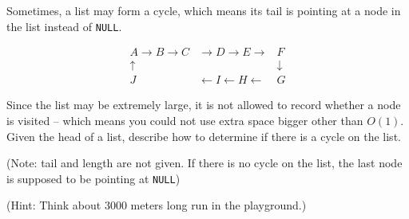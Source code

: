 \documentclass[10.5pt]{article}
\begin{document}
\begin{enumerate}[(a)]
		Sometimes, a list may form a cycle, which means its tail is pointing at 
		a node in the list  instead of \texttt{NULL}.
		
		$$
		\begin{aligned}
		A \rightarrow B \rightarrow C& \rightarrow D \rightarrow E\rightarrow &F\\
		\uparrow&&\downarrow\\
		J&\leftarrow I\leftarrow H\leftarrow&G
		\end{aligned}
		$$
		
		Since the list may be extremely large, it is not allowed to record whether a
		node is visited -- which means you could not use extra space bigger other than $O(1)$.
		Given the head of a list, describe how to determine if there is a cycle on the list.
		
		(Note: tail and length are not given. 
		If there is no cycle on the list, 
		the last node is supposed to 
		be pointing at \texttt{NULL})		

		(Hint: Think about 3000 meters long run in the playground.)

	\end{enumerate}
	
	\pagebreak
	
\end{document}
